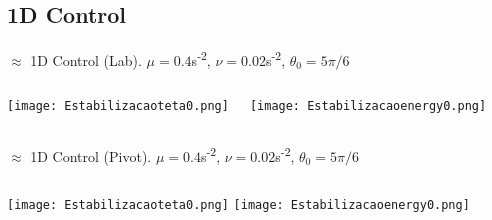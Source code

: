 \documentclass{beamer}
\begin{document}
\subsection{1D Control}
\begin{frame}[t]{$\approx$ 1D Control (Lab). $\mu=0.4$s\textsuperscript{-2}, $\nu=0.02$s\textsuperscript{-2}, $\theta_0=5\pi/6$}
  \begin{columns}
          \centering
           
           \texttt{[image: Estabilizacaoteta0.png]}
         
        
           \texttt{[image: Estabilizacaoenergy0.png]}
        

  \end{columns}
\end{frame}
\begin{frame}[t]{$\approx$ 1D Control (Pivot). $\mu=0.4$s\textsuperscript{-2}, $\nu=0.02$s\textsuperscript{-2}, $\theta_0=5\pi/6$}
  \begin{columns}
             \centering
             \texttt{[image: Estabilizacaoteta0.png]}
           \texttt{[image: Estabilizacaoenergy0.png]}          
 
  \end{columns}
\end{frame}
\end{document}
